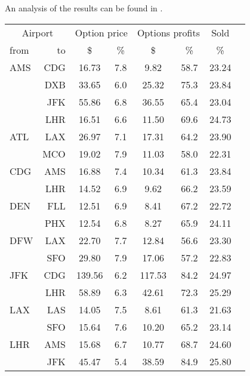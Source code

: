 An analysis of the results can be found in .
\\[2em]
\begin{table}[h]
    \small
    \begin{center}
        \begin{tabular}{l r c c c c c c}
            \toprule
            \multicolumn{2}{c}{Airport}  & \multicolumn{2}{c}{Option price} & \multicolumn{2}{c}{Options profits}  &  Sold  \\[.4ex]
            from  &  to  &  \$  & \%  &  \$  & \%  & \%  \\
            \midrule
AMS  &  CDG &   16.73  &     7.8  &    9.82  &    58.7  &   23.24  \\
     &  DXB &   33.65  &     6.0  &   25.32  &    75.3  &   23.84  \\
     &  JFK &   55.86  &     6.8  &   36.55  &    65.4  &   23.04  \\
     &  LHR &   16.51  &     6.6  &   11.50  &    69.6  &   24.73  \\[.5ex]
ATL  &  LAX &   26.97  &     7.1  &   17.31  &    64.2  &   23.90  \\
     &  MCO &   19.02  &     7.9  &   11.03  &    58.0  &   22.31  \\[.5ex]
CDG  &  AMS &   16.88  &     7.4  &   10.34  &    61.3  &   23.84  \\
     &  LHR &   14.52  &     6.9  &    9.62  &    66.2  &   23.59  \\[.5ex]
DEN  &  FLL &   12.51  &     6.9  &    8.41  &    67.2  &   22.72  \\
     &  PHX &   12.54  &     6.8  &    8.27  &    65.9  &   24.11  \\[.5ex]
DFW  &  LAX &   22.70  &     7.7  &   12.84  &    56.6  &   23.30  \\
     &  SFO &   29.80  &     7.9  &   17.06  &    57.2  &   22.83  \\[.5ex]
JFK  &  CDG &  139.56  &     6.2  &  117.53  &    84.2  &   24.97  \\
     &  LHR &   58.89  &     6.3  &   42.61  &    72.3  &   25.29  \\[.5ex]
LAX  &  LAS &   14.05  &     7.5  &    8.61  &    61.3  &   21.63  \\
     &  SFO &   15.64  &     7.6  &   10.20  &    65.2  &   23.14  \\[.5ex]
LHR  &  AMS &   15.68  &     6.7  &   10.77  &    68.7  &   24.60  \\
     &  JFK &   45.47  &     5.4  &   38.59  &    84.9  &   25.80  \\

\end{tabular}
\end{center}
\end{table}
